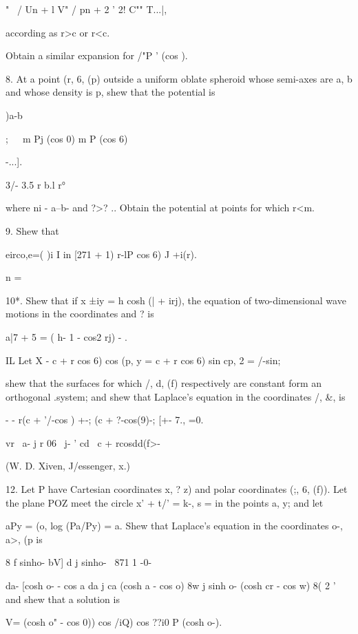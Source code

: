 "~ / Un + l V" / pn + 2 ' 2! C"" T...|,

according as r>c or r<c.

Obtain a similar expansion for /"P ' (cos ). 

8. At a point (r, 6, (p) outside a uniform oblate spheroid whose
semi-axes are a, b and whose density is p, shew that the potential is

)a-b

;\ \ \ m Pj (cos 0) m P (cos 6)

-...].

3/- 3.5 r b.l r°

where ni - a--b- and ?>? .. Obtain the potential at points for which
r<m.


%
%

9. Shew that

eirco,e=( )i I in [271 + 1) r-lP cos 6) J +i(r).

n =


10*. Shew that if x ±iy = h cosh (| + irj), the equation of
two-dimensional wave motions in the coordinates and ? is

a|7 + 5 = ( h- 1 - cos2 rj) - . 

IL Let X - c + r cos 6) cos (p, y = c + r cos 6) sin cp, 2 = /-sin;

shew that the surfaces for which /, d, (f) respectively are constant
form an orthogonal .system; and shew that Laplace's equation in the
coordinates /, \&, is

- - r(c + '/-cos ) +-; (c + ?-cos(9)-; [+- 7., =0.

vr \ a- j r 06 \ j- ' cd \ c + rcosdd(f>-

(W. D. Xiven, J/essenger, x.)

12. Let P have Cartesian coordinates x, ? z) and polar coordinates
(;, 6, (f)). Let the plane POZ meet the circle x' + t/' = k-, s = in
the points a, y; and let

aPy = (o, log (Pa/Py) = a. Shew that Laplace's equation in the
coordinates o-, a>, (p is

8 f sinho- bV] d j sinho- \ 871 1 -0-

da- [cosh o- - cos a da j ca (cosh a - cos o) 8w j sinh o- (cosh cr -
cos w) 8( 2 ' and shew that a solution is

V= (cosh o" - cos 0)) cos /iQ) cos ??i0 P (cosh o-).

